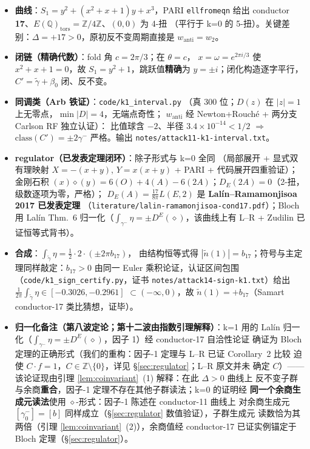 \documentclass[11pt,a4paper]{ctexart}
\theoremstyle{remark}
\newcommand{\QQ}{\mathbb{Q}}
\newcommand{\ZZ}{\mathbb{Z}}
\begin{document}
\begin{itemize}[nosep]
\item \textbf{曲线}：$S_1=y^2+(x^2+x+1)y+x^3$，PARI \texttt{ellfromeqn} 给出
conductor \textbf{17}、$E(\QQ)_{\mathrm{tors}}=\ZZ/4\ZZ$、$(0,0)$ 为 4-扭
（平行于 k=0 的 5-扭）。关键差别：$\Delta=+17>0$，原初反不变周期直接是
$w_{\mathrm{anti}}=w_2$。
\item \textbf{闭链（精确代数）}：fold 角 $c=2\pi/3$；在 $\theta=c$，
$x=\omega=e^{2\pi i/3}$ 使 $x^2+x+1=0$，故 $S_1=y^2+1$，跳跃值\textbf{精确}为
$y=\pm i$；闭化构造逐字平行，$C'=\tilde\gamma+\beta_0$ 闭、反不变。
\item \textbf{同调类（Arb 铁证）}：\texttt{code/k1\_interval.py}
（真 300 位；$D(z)$ 在 $|z|=1$ 上无零点，$\min|D|=4$，无端点奇性；
$w_{\mathrm{anti}}$ 经 Newton+Rouch\'e + 两分支 Carlson RF 独立认证）：
比值球含 $-2$、半径 $3.4\times10^{-14}<1/2$ $\Rightarrow$
$\mathrm{class}(C')=\pm2\gamma^-$ 严格。输出 \texttt{notes/attack11-k1-interval.txt}。
\item \textbf{regulator（已发表定理闭环）}：除子形式与 k=0 全同
（局部展开 + 显式双有理映射 $X=-(x+y)$, $Y=x(x+y)$ + PARI + 代码展开四重验证）；
金刚石积 $(x)\diamond(y)=6(O)+4(A)-6(2A)$；$D_E(2A)=0$（2-扭，级数逐项为零，严格）；
$D_E(A)=\frac{17}{8\pi}L(E,2)$ 是 \textbf{Lal\'in--Ramamonjisoa 2017 已发表定理}
（\texttt{literature/lalin-ramamonjisoa-cond17.pdf}）；Bloch 用 Lal\'in Thm.~6
归一化（$\int_{\gamma^-}\eta=\pm D^E(\diamond)$，该曲线上有 L--R + Zudilin
已证恒等式背书）。
\item \textbf{合成}：$\int_{\tilde\gamma}\eta=\frac12\cdot2\cdot(\pm2\pi b_{17})$，
由结构恒等式得 $|\tilde n(1)|=b_{17}$；符号与主定理同样敲定：$b_{17}>0$ 由同一 Euler
乘积论证，认证区间包围（\texttt{code/k1\_sign\_certify.py}，证书
\texttt{notes/attack14-sign-k1.txt}）给出
$\frac1{2\pi}\int_{\tilde\gamma}\eta\in[-0.3026,-0.2961]$ $\subset(-\infty,0)$，故
$\boxed{\tilde n(1)=+b_{17}}$（Samart conductor-17 类比猜想，证毕）。
\item \textbf{归一化备注（第八波定论；第十二波由指数引理解释）}：k=1 用的 Lal\'in
归一化（$\int_{\gamma^-}\eta=\pm D^E(\diamond)$，因子 1）经 conductor-17 自洽性论证
确证为 Bloch 定理的正确形式（我们的重构：因子-1 定理与 L--R 已证 Corollary~2 比较
迫使 $C\cdot f=1$，$C\in\ZZ\setminus\{0\}$，详见 \S\ref{sec:regulator}；L--R 原文并未
确定 $C$）——该论证现由引理 \ref{lem:coinvariant}~(1) 解释：在此 $\Delta>0$ 曲线上
反不变子群与余商\textbf{重合}，因子-1 定理不存在其他子群读法；k=0 的证明经
\textbf{同一个余商生成元读法}使用 $\diamond$-形式：因子-1 陈述在 conductor-11 曲线上
对余商生成元 $[\gamma^-_0]=[b]$ 同样成立（\S\ref{sec:regulator} 数值验证），子群生成元
读数恰为其两倍（引理 \ref{lem:coinvariant}~(2)），余商值经 conductor-17 已证实例锚定于
Bloch 定理（\S\ref{sec:regulator}）。
\end{itemize}
\end{document}
